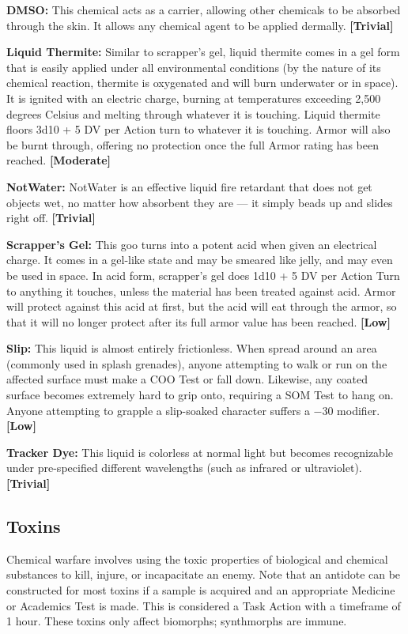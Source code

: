 \textbf{DMSO:} This chemical acts as a carrier, allowing other chemicals to be absorbed through the skin. It allows any chemical agent to be applied dermally. \textbf{[Trivial]}

\textbf{Liquid Thermite:} Similar to scrapper’s gel, liquid thermite comes in a gel form that is easily applied under all environmental conditions (by the nature of its chemical reaction, thermite is oxygenated and will burn underwater or in space). It is ignited with an electric charge, burning at temperatures exceeding 2,500 degrees Celsius and melting through whatever it is touching. Liquid thermite floors 3d10 + 5 DV per Action turn to whatever it is touching. Armor will also be burnt through, offering no protection once the full Armor rating has been reached. \textbf{[Moderate]}

\textbf{NotWater:} NotWater is an effective liquid fire retardant that does not get objects wet, no matter how absorbent they are --- it simply beads up and slides right off. \textbf{[Trivial]}

\textbf{Scrapper’s Gel:} This goo turns into a potent acid when given an electrical charge. It comes in a gel-like state and may be smeared like jelly, and may even be used in space. In acid form, scrapper’s gel does 1d10 + 5 DV per Action Turn to anything it touches, unless the material has been treated against acid. Armor will protect against this acid at first, but the acid will eat through the armor, so that it will no longer protect after its full armor value has been reached. \textbf{[Low]}

\textbf{Slip:} This liquid is almost entirely frictionless. When spread around an area (commonly used in splash grenades), anyone attempting to walk or run on the affected surface must make a COO Test or fall down. Likewise, any coated surface becomes extremely hard to grip onto, requiring a SOM Test to hang on. Anyone attempting to grapple a slip-soaked character suffers a $-$30 modifier. \textbf{[Low]}

\textbf{Tracker Dye:} This liquid is colorless at normal light but becomes recognizable under pre-specified different wavelengths (such as infrared or ultraviolet). \textbf{[Trivial]}


\subsection{Toxins}
\label{sec:toxins}

Chemical warfare involves using the toxic properties of biological and chemical substances to kill, injure, or incapacitate an enemy. Note that an antidote can be constructed for most toxins if a sample is acquired and an appropriate Medicine or Academics Test is made. This is considered a Task Action with a timeframe of 1 hour. These toxins only affect biomorphs; synthmorphs are immune.

